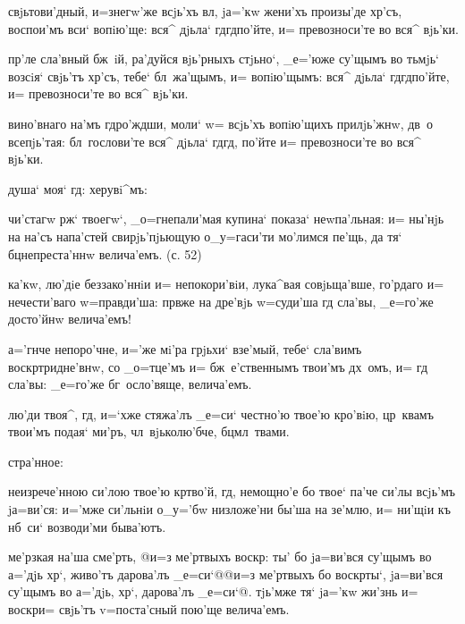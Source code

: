  свjьтови'дный, и=з\ъ негw'же всjь'хъ вл, 
jа='кw жени'хъ произы'де хр'съ, воспои'мъ вси` 
вопiю'ще: вся^ дjьла` гд гд по'йте, и= 
превозноси'те во вся^ вjь'ки.

 пр'ле сла'вный бж~iй, ра'дуйся вjь'рныхъ 
стjьно`, _е='юже су'щымъ во тьмjь` возсiя` свjь'тъ 
хр'съ, тебе` бл~жа'щымъ, и= вопiю'щымъ: вся^ дjьла` 
гд гд по'йте, и= превозноси'те во вся^ вjь'ки.

 вино'внаго на'мъ гд ро'ждши, моли` w= 
всjь'хъ вопiю'щихъ прилjь'жнw, дв~о всепjь'тая: 
бл~гослови'те вся^ дjьла` гд гд, по'йте и= 
превозноси'те во вся^ вjь'ки.

     душа` моя` 
гд:    херувi^мъ:


  чи'стагw рж` твоегw`, 
_о=гнепали'мая купина` показа` неwпа'льная: и= ны'нjь на 
на'съ напа'стей свирjь'пjьющую о_у=гаси'ти мо'лимся 
пе'щь, да тя` бц непреста'ннw велича'емъ. (с. 52)

 ка'кw, лю'дiе беззако'ннiи и= непокори'вiи, 
лука^вая совjьща'вше, го'рдаго и= нечести'ваго 
w=правди'ша: прв же на дре'вjь w=суди'ша гд 
сла'вы, _е=го'же досто'йнw велича'емъ!

 а='гнче непоро'чне, и='же мi'ра грjьхи` 
взе'мый, тебе` сла'вимъ воскр тридне'внw, со 
_о=тце'мъ и= бж~е'ственнымъ твои'мъ дх~омъ, и= гд 
сла'вы: _е=го'же бг~осло'вяще, велича'емъ.

  лю'ди твоя^, гд, и=`хже 
стяжа'лъ _е=си` честно'ю твое'ю кро'вiю, цр~квамъ твои'мъ 
подая` ми'ръ, чл~вjьколю'бче, бц мл~твами.

   стра'нное:

 неизрече'нною си'лою твое'ю кр тво'й, 
гд, немощно'е бо твое` па'че си'лы всjь'мъ jа=ви'ся: 
и='мже си'льнiи о_у='бw низложе'ни бы'ша на зе'млю, и= 
ни'щiи къ нб~си` возводи'ми быва'ютъ.

 ме'рзкая на'ша сме'рть, @и=з\ъ 
ме'ртвыхъ воскр: ты' бо jа=ви'вся су'щымъ во 
а='дjь хр`, живо'тъ дарова'лъ _е=си`@{@и=з\ъ 
ме'ртвыхъ бо воскр ты`, jа=ви'вся су'щымъ во а='дjь, 
хр`, дарова'лъ _е=си`@}. тjь'мже тя` jа='кw жи'знь и= 
воскр и= свjь'тъ v=поста'сный пою'ще велича'емъ.

